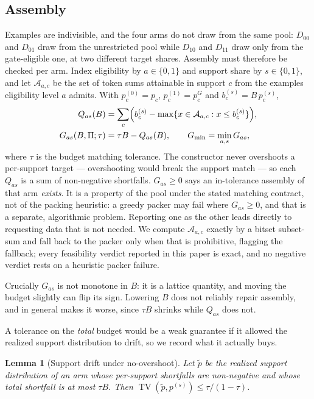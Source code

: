 \documentclass[10pt,twocolumn]{article}
\newtheorem{lemma}{Lemma}
\begin{document}
\subsection{Assembly}
Examples are indivisible, and the four arms do not draw from the same pool: $D_{00}$ and
$D_{01}$ draw from the unrestricted pool while $D_{10}$ and $D_{11}$ draw only from the
gate-eligible one, at two different target shares. Assembly must therefore be checked per arm.
Index eligibility by $a\in\{0,1\}$ and support share by $s\in\{0,1\}$, and let
$\mathcal{A}_{a,c}$ be the set of token sums attainable in support $c$ from the examples
eligibility level $a$ admits. With $p^{(0)}_c=p_c$, $p^{(1)}_c=p^G_c$ and
$b^{(s)}_c=B\,p^{(s)}_c$,
\begin{align}
Q_{as}(B) &= \sum_c \Bigl( b^{(s)}_c - \max\{x\in\mathcal{A}_{a,c} : x\le b^{(s)}_c\} \Bigr),
\label{eq:Q}\\
G_{as}(B,\Pi;\tau) &= \tau B - Q_{as}(B), \qquad
G_{\min} = \min_{a,s} G_{as},
\label{eq:G}
\end{align}
where $\tau$ is the budget matching tolerance. The constructor never overshoots a per-support
target --- overshooting would break the support match --- so each $Q_{as}$ is a sum of
non-negative shortfalls. $G_{as}\ge 0$ says an in-tolerance assembly of that arm
\emph{exists}. It is a property of the pool under the stated matching contract, not of the
packing heuristic: a greedy packer may fail where $G_{as}\ge0$, and that is a separate,
algorithmic problem. Reporting one as the other leads directly to requesting data that is not
needed. We compute $\mathcal{A}_{a,c}$ exactly by a bitset subset-sum and fall back to the
packer only when that is prohibitive, flagging the fallback; every feasibility verdict reported
in this paper is exact, and no negative verdict rests on a heuristic packer failure.

Crucially $G_{as}$ is not monotone in $B$: it is a lattice quantity, and moving the budget
slightly can flip its sign. Lowering $B$ does not reliably repair assembly, and in general makes
it worse, since $\tau B$ shrinks while $Q_{as}$ does not.

A tolerance on the \emph{total} budget would be a weak guarantee if it allowed the realized
support distribution to drift, so we record what it actually buys.

\begin{lemma}[Support drift under no-overshoot]
\label{lem:tv}
Let $\tilde p$ be the realized support distribution of an arm whose per-support shortfalls are
non-negative and whose total shortfall is at most $\tau B$. Then
$\operatorname{TV}(\tilde p, p^{(s)}) \le \tau/(1-\tau)$.
\end{lemma}
\end{document}
